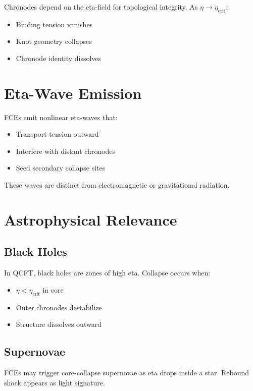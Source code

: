 \documentclass[12pt]{article}
\begin{document}
Chronodes depend on the eta-field for topological integrity. As $\eta \to \eta_{\text{crit}}$:

\begin{itemize}
\item Binding tension vanishes
\item Knot geometry collapses
\item Chronode identity dissolves
\end{itemize}

\section{Eta-Wave Emission}

FCEs emit nonlinear eta-waves that:

\begin{itemize}
\item Transport tension outward
\item Interfere with distant chronodes
\item Seed secondary collapse sites
\end{itemize}

These waves are distinct from electromagnetic or gravitational radiation.

\section{Astrophysical Relevance}

\subsection*{Black Holes}

In QCFT, black holes are zones of high eta. Collapse occurs when:

\begin{itemize}
\item $\eta < \eta_{\text{crit}}$ in core
\item Outer chronodes destabilize
\item Structure dissolves outward
\end{itemize}

\subsection*{Supernovae}

FCEs may trigger core-collapse supernovae as eta drops inside a star. Rebound shock appears as light signature.
\end{document}

